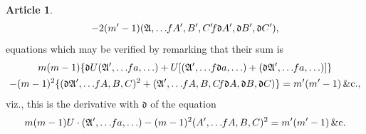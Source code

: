 \documentclass[12pt,a4paper]{article}
\theoremstyle{definition}
\newtheorem{art}{Article}[section]
\begin{document}
\begin{art}
\begin{multline*}
- 2(m' - 1)(\mathfrak{A}, \ldots \hspace{-2pt} fA', B', C' \hspace{-2pt} f\mathfrak{d}A', \mathfrak{d}B', \mathfrak{d}C'),
\end{multline*}
equations which may be verified by remarking that their sum is
\begin{multline*}
m(m - 1)\{\mathfrak{d}U(\mathfrak{A}', \ldots \hspace{-2pt} fa, \ldots) + U[(\mathfrak{A}', \ldots \hspace{-2pt} f\mathfrak{d}a, \ldots) + (\mathfrak{d}\mathfrak{A}', \ldots \hspace{-2pt} fa, \ldots)]\} \\
- (m - 1)^2\{(\mathfrak{d}\mathfrak{A}', \ldots \hspace{-2pt} fA, B, C)^2 + (\mathfrak{A}', \ldots \hspace{-2pt} fA, B, C \hspace{-2pt} f\mathfrak{d}A, \mathfrak{d}B, \mathfrak{d}C)\} = m'(m' - 1)\, \&\text{c.},
\end{multline*}
viz., this is the derivative with $\mathfrak{d}$ of the equation
\[
m(m - 1)U \cdot (\mathfrak{A}', \ldots \hspace{-2pt} fa, \ldots) - (m - 1)^2(A', \ldots \hspace{-2pt} fA, B, C)^2 = m'(m' - 1)\, \&\text{c.}
\]
\end{art}
\end{document}
